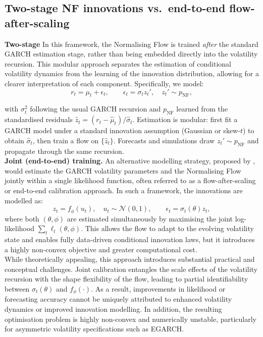 \documentclass[oneside,12pt]{CUEDthesisPSnPDF}
\newcommand{\textcite}{\citet}
\begin{document}

\subsection{Two-stage NF innovations vs.\ end-to-end flow-after-scaling}
\label{sec:nf-contrast}
\noindent
\textbf{Two-stage} In this framework, the Normalising Flow is trained \emph{after} the standard GARCH estimation stage, rather than being embedded directly into the volatility recursion. This modular approach separates the estimation of conditional volatility dynamics from the learning of the innovation distribution, allowing for a clearer interpretation of each component. Specifically, we model:\\

\[
r_t=\mu_t+\epsilon_t,\qquad \epsilon_t=\sigma_t z_t', \quad z_t' \sim p_{\text{NF}},
\]

with $\sigma_t^2$ following the usual GARCH recursion and $p_{\text{NF}}$ learned from the standardised residuals $\hat z_t=(r_t-\hat\mu_t)/\hat\sigma_t$. Estimation is modular: first fit a GARCH model under a standard innovation assumption (Gaussian or skew-$t$) to obtain 
$\hat\sigma_t$, then train a flow on $\{\hat z_t\}$. 
Forecasts and simulations draw $z_t' \sim p_{\text{NF}}$ 
and propagate through the same recursion.\\

\medskip
\noindent
\textbf{Joint (end-to-end) training.} 
An alternative modelling strategy, proposed by \textcite{seitz2022garchnf}, would estimate the GARCH volatility parameters and the Normalising Flow jointly within a single likelihood function, often referred to as a flow-after-scaling or end-to-end calibration approach. In such a framework, the innovations are modelled as:
\[
z_t = f_\phi(u_t), \quad u_t \sim \mathcal{N}(0,1), \qquad 
\epsilon_t = \sigma_t(\theta) z_t,
\]
where both $(\theta, \phi)$ are estimated simultaneously by maximising 
the joint log-likelihood 
$\sum_t \ell_t(\theta, \phi)$. 
This allows the flow to adapt to the evolving volatility state 
and enables fully data-driven conditional innovation laws, 
but it introduces a highly non-convex objective and greater computational cost.\\

While theoretically appealing, this approach introduces substantial practical and conceptual challenges. Joint calibration entangles the scale effects of the volatility recursion with the shape flexibility of the flow, leading to partial identifiability between $\sigma_t(\theta)$ and $f_\phi(\cdot)$. As a result, improvements in likelihood or forecasting accuracy cannot be uniquely attributed to enhanced volatility dynamics or improved innovation modelling. In addition, the resulting optimisation problem is highly non-convex and numerically unstable, particularly for asymmetric volatility specifications such as EGARCH.\\
\end{document}
